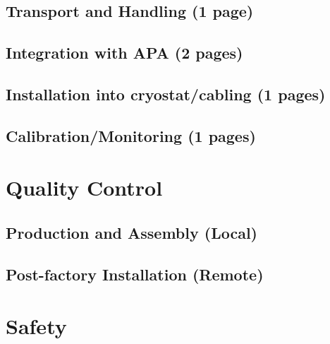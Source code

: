 \subsection{Transport and Handling (1 page)}
\label{sec:fdsp-pd-install-transport}


\subsection{Integration with APA  (2 pages)}
\label{sec:fdsp-pd-install-pd-apa}

\subsection{Installation into cryostat/cabling  (1 pages)}
\label{sec:fdsp-pd-install-pd-cryo}

\subsection{Calibration/Monitoring  (1 pages)}
\label{sec:fdsp-pd-install-calib}


\section{Quality Control}
\label{sec:fdsp-pd-qc}


\subsection{Production and Assembly (Local)}
\label{sec:fdsp-pd-qc-local}


\subsection{Post-factory Installation (Remote)}
\label{sec:fdsp-pd-qc-remote}


\section{Safety}
\label{sec:fdsp-pd-safety}

